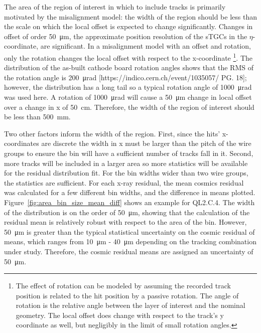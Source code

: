 The area of the region of interest in which to include tracks is primarily motivated by the misalignment model: the width of the region should be less than the scale on which the local offset is expected to change significantly. Changes in offset of order \SI{50}{\micro\meter}, the approximate position resolution of the sTGCs in the $\eta$-coordinate, are significant. In a misalignment model with an offset and rotation, only the rotation changes the local offset with respect to the x-coordinate \footnote{The effect of rotation can be modeled by assuming the recorded track position is related to the hit position by a passive rotation. The angle of rotation is the relative angle between the layer of interest and the nominal geometry. The local offset does change with respect to the track's y coordinate as well, but negligibly in the limit of small rotation angles.}.  The distribution of the as-built cathode board rotation angles shows that the RMS of the rotation angle is \SI{200}{\micro\radian} [https://indico.cern.ch/event/1035057/ PG. 18]; however, the distribution has a long tail so a typical rotation angle of \SI{1000}{\micro\radian} was used here. A rotation of \SI{1000}{\micro\radian} will cause a \SI{50}{\micro\meter} change in local offset over a change in x of \SI{50}{\centi\meter}. Therefore, the width of the region of interest should be less than \SI{500}{\milli\meter}.

Two other factors inform the width of the region. First, since the hits' x-coordinates are discrete the width in x must be larger than the pitch of the wire groups to ensure the bin will have a sufficient number of tracks fall in it. Second, more tracks will be included in a larger area so more statistics will be available for the residual distribution fit. For the bin widths wider than two wire groups, the statistics are sufficient. For each x-ray residual, the mean cosmics residual was calculated for a few different bin widths, and the difference in means plotted. Figure~\ref{fig:area_bin_size_mean_diff} shows an example for QL2.C.4. The width of the distribution is on the order of \SI{50}{\micro\meter}, showing that the calculation of the residual mean is relatively robust with respect to the area of the bin. However, \SI{50}{\micro\meter} is greater than the typical statistical uncertainty on the cosmic residual of means, which ranges from \SI{10}{\micro\meter} - \SI{40}{\micro\meter} depending on the tracking combination under study. Therefore, the cosmic residual means are assigned an uncertainty of \SI{50}{\micro\meter}.

